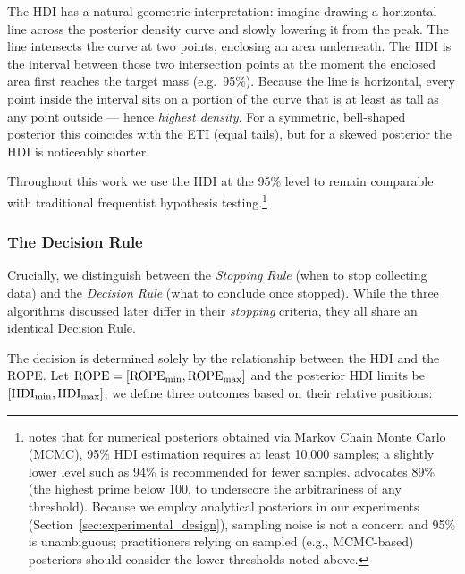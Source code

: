 The HDI has a natural geometric interpretation: imagine drawing a horizontal line across
the posterior density curve and slowly lowering it from the peak. The line intersects the
curve at two points, enclosing an area underneath. The HDI is the interval between those
two intersection points at the moment the enclosed area first reaches the target mass
(e.g.\ 95\%). Because the line is horizontal, every point inside the interval sits on a
portion of the curve that is at least as tall as any point outside — hence \textit{highest
density}. For a symmetric, bell-shaped posterior this coincides with the ETI (equal tails),
but for a skewed posterior the HDI is noticeably shorter.

Throughout this work we use the HDI at the 95\% level to remain comparable with traditional
frequentist hypothesis testing.\footnote{\cite{kruschke2015doing} notes that for numerical posteriors
obtained via Markov Chain Monte Carlo (MCMC), 95\% HDI estimation requires at least 10{,}000 samples; a slightly lower
level such as 94\% is recommended for fewer samples. \cite{mcelreath2016} advocates 89\%
(the highest prime below 100, to underscore the arbitrariness of any threshold). Because we employ analytical
posteriors in our experiments (Section~\ref{sec:experimental_design}), sampling noise is not a
concern and 95\% is unambiguous; practitioners relying on sampled (e.g., MCMC-based) posteriors
should consider the lower thresholds noted above.}

\subsubsection{The Decision Rule}\label{sec:decision_criterion}

Crucially, we distinguish between the \textit{Stopping Rule} (when to stop collecting data)
and the \textit{Decision Rule} (what to conclude once stopped). While the three algorithms
discussed later differ in their \textit{stopping} criteria, they all share an identical
Decision Rule.

The decision is determined solely by the
relationship between the HDI and the ROPE.
Let ${\rm ROPE} = [{\rm ROPE}_{\rm min}, {\rm ROPE}_{\rm max}]$ and the posterior HDI limits be
$[{\rm HDI}_{\rm min}, {\rm HDI}_{\rm max}]$,
we define three outcomes based on their relative positions:

